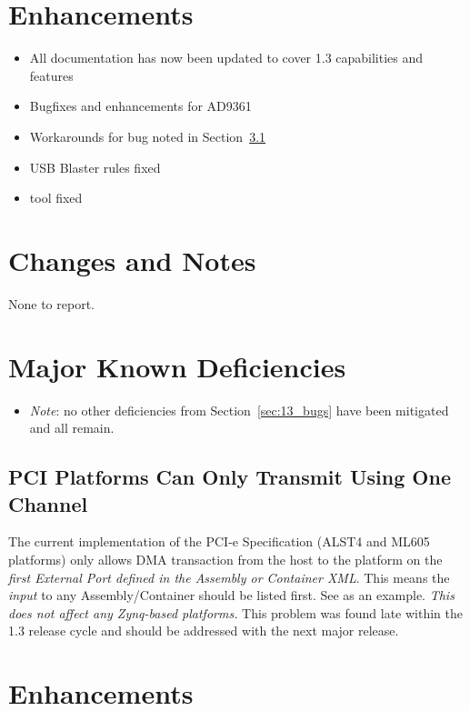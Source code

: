 \section{Enhancements}
\begin{itemize}
\item All documentation has now been updated to cover 1.3 capabilities and features
\item Bugfixes and enhancements for AD9361
\item Workarounds for bug noted in Section~\ref{bug:3783}
\item USB Blaster  rules fixed
\item {} tool fixed
\end{itemize}

\section{Changes and Notes}
None to report.
\section{Major Known Deficiencies}
\begin{itemize}
\item \textit{Note}: no other deficiencies from Section~\ref{sec:13_bugs} have been mitigated and all remain.
\end{itemize}
\subsection{PCI Platforms Can Only Transmit Using One Channel} %
\label{bug:3783}

The current implementation of the PCI-e Specification (ALST4 and ML605 platforms) only allows DMA transaction from the host to the platform on the \textit{first External Port defined in the Assembly or Container XML}. This means the \textit{input} to any Assembly/Container should be listed first. See
as an example. \textit{This does not affect any Zynq-based platforms.} This problem was found late within the 1.3 release cycle and should be addressed with the next major release.


\newpage
{}
\def\ocpiversion{v1.3.0}  %
\section{Enhancements}
\label{sec:13_enhancements}
